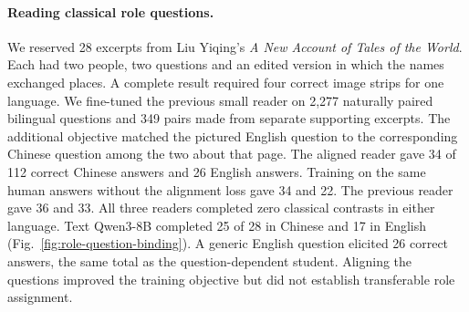 \paragraph{Reading classical role questions.}
We reserved 28 excerpts from Liu Yiqing's \textit{A New Account of Tales of the World}. Each had two people, two questions and an edited version in which the names exchanged places. A complete result required four correct image strips for one language. We fine-tuned the previous small reader on 2,277 naturally paired bilingual questions and 349 pairs made from separate supporting excerpts. The additional objective matched the pictured English question to the corresponding Chinese question among the two about that page. The aligned reader gave 34 of 112 correct Chinese answers and 26 English answers. Training on the same human answers without the alignment loss gave 34 and 22. The previous reader gave 36 and 33. All three readers completed zero classical contrasts in either language. Text Qwen3-8B completed 25 of 28 in Chinese and 17 in English (Fig.~\ref{fig:role-question-binding}). A generic English question elicited 26 correct answers, the same total as the question-dependent student. Aligning the questions improved the training objective but did not establish transferable role assignment.
